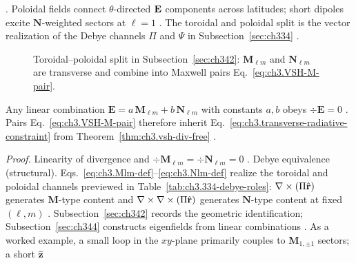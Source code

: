 \cite{stratton1941}. Poloidal fields connect \(\theta\)-directed \(\mathbf{E}\) components across latitudes;
short dipoles excite \(\mathbf{N}\)-weighted sectors at \(\ell=1\) \cite{jackson1999}. The toroidal
and poloidal split is the vector realization of the Debye channels \(\Pi\) and \(\Psi\) in
Subsection~\ref{sec:ch334} \cite{tai1994}.
\begin{figure}[t]
\centering
{}
\caption{Toroidal--poloidal split in Subsection~\ref{sec:ch342}: \(\mathbf{M}_{\ell m}\) and \(\mathbf{N}_{\ell m}\)
are transverse and combine into Maxwell pairs Eq.~\eqref{eq:ch3.VSH-M-pair}.}
\label{fig:ch3.toroidal-poloidal-split}
\end{figure}
\begin{proposition}
\label{prop:ch3.MN-div-free-span}
Any linear combination \(\mathbf{E}=a\,\mathbf{M}_{\ell m}+b\,\mathbf{N}_{\ell m}\) with constants \(a,b\) obeys
\(\div\mathbf{E}=0\) \cite{stratton1941}. Pairs Eq.~\eqref{eq:ch3.VSH-M-pair} therefore inherit
Eq.~\eqref{eq:ch3.transverse-radiative-constraint} from Theorem~\ref{thm:ch3.vsh-div-free}
\cite{stratton1941}.
\end{proposition}
\noindent\textit{Proof.}
Linearity of divergence and \(\div\mathbf{M}_{\ell m}=\div\mathbf{N}_{\ell m}=0\) \cite{tai1994}.
Debye equivalence (structural). Eqs.~\eqref{eq:ch3.Mlm-def}--\eqref{eq:ch3.Nlm-def} realize the toroidal and poloidal channels previewed in
Table~\ref{tab:ch3.334-debye-roles}: \(\nabla\times(\Pi\hat{\mathbf{r}})\) generates \(\mathbf{M}\)-type content and
\(\nabla\times\nabla\times(\Pi\hat{\mathbf{r}})\) generates \(\mathbf{N}\)-type content at fixed \((\ell,m)\) \cite{tai1994}.
Subsection~\ref{sec:ch342} records the geometric identification; Subsection~\ref{sec:ch344} constructs eigenfields
from linear combinations \cite{stratton1941}.
As a worked example, a small loop in the \(xy\)-plane primarily couples to \(\mathbf{M}_{1,\pm1}\) sectors; a short \(\hat{\mathbf{z}}\)
